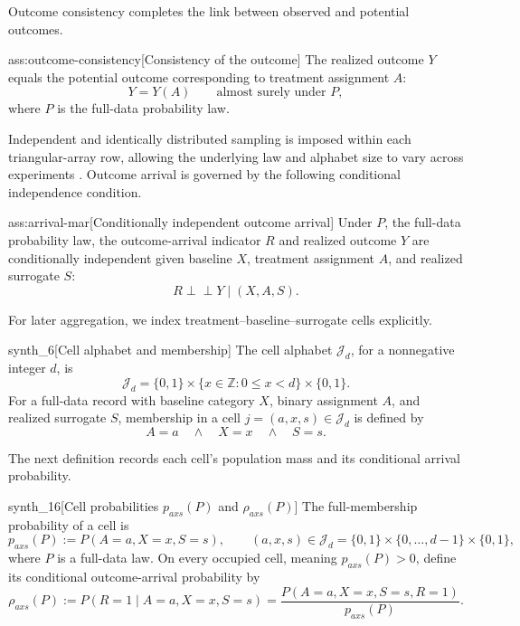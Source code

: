 Outcome consistency completes the link between observed and potential outcomes.

\begin{assumptionv}{ass:outcome-consistency}[Consistency of the outcome]
The realized outcome \(Y\) equals the potential outcome corresponding to treatment assignment \(A\):
\[
Y=Y(A)\qquad\text{almost surely under }P,
\]
where \(P\) is the full-data probability law.
\end{assumptionv}

Independent and identically distributed sampling is imposed within each triangular-array row, allowing the underlying law and alphabet size to vary across experiments \citep{ZengBalakrishnanHanKennedy2026}. Outcome arrival is governed by the following conditional independence condition.

\begin{assumptionv}{ass:arrival-mar}[Conditionally independent outcome arrival]
Under \(P\), the full-data probability law, the outcome-arrival indicator \(R\) and realized outcome \(Y\) are conditionally independent given baseline \(X\), treatment assignment \(A\), and realized surrogate \(S\):
\[
R\perp\!\!\!\perp Y\mid(X,A,S).
\]
\end{assumptionv}

For later aggregation, we index treatment--baseline--surrogate cells explicitly.

\begin{definitionv}{synth_6}[Cell alphabet and membership]
The cell alphabet \(\mathcal J_d\), for a nonnegative integer \(d\), is
\[
\mathcal J_d
=
\{0,1\}\times\{x\in\mathbb Z:0\le x<d\}\times\{0,1\}.
\]
For a full-data record with baseline category \(X\), binary assignment \(A\), and realized surrogate \(S\), membership in a cell \(j=(a,x,s)\in\mathcal J_d\) is defined by
\[
A=a \quad\land\quad X=x \quad\land\quad S=s.
\]
\end{definitionv}

The next definition records each cell's population mass and its conditional arrival probability.

\begin{definitionv}{synth_16}[Cell probabilities \(p_{axs}(P)\) and \(\rho_{axs}(P)\)]
The full-membership probability of a cell is
\[
p_{axs}(P):=P(A=a,X=x,S=s),
\qquad
(a,x,s)\in\mathcal J_d
=\{0,1\}\times\{0,\ldots,d-1\}\times\{0,1\},
\]
where \(P\) is a full-data law. On every occupied cell, meaning \(p_{axs}(P)>0\), define its conditional outcome-arrival probability by
\[
\rho_{axs}(P)
:=
P(R=1\mid A=a,X=x,S=s)
=
\frac{P(A=a,X=x,S=s,R=1)}{p_{axs}(P)}.
\]
\end{definitionv}

